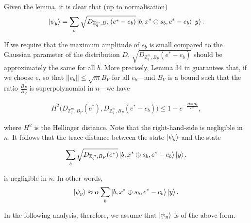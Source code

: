 \documentclass{article}
\begin{document}
\begin{itemize}
		Given the lemma, it is clear that (up to normalisation)
		\begin{align}
			\ket{\psi_y} = \sum_b \sqrt{D_{\mathbb{Z}_q^m, B_P}(e^* - e_b)} \ket{b, x^* \oplus s_b, e^* - e_b} \ket{y}.
		\end{align}

		If we require that the maximum amplitude of $e_b$ is small compared to the Gaussian parameter of the distribution $D$, $\sqrt{D_{\mathbb{Z}_q^m, B_P}(e^* - e_b)}$ should be approximately the same for all $b$. More precisely, Lemma 34 in \cite{randomness} guarantees that, if we choose $e_i$ so that $||e_b|| \leq \sqrt{m} B_V$ for all $e_b$---and $B_V$ is a bound such that the ratio $\frac{B_P}{B_V}$ is superpolynomial in $n$---we have

\begin{align}
	H^2\big( D_{\mathbb{Z}_q^m, B_P}(e^*), D_{\mathbb{Z}_q^m, B_P}(e^* - e_b) \big) \leq 1 - e^{-\frac{2\pi m B_V}{B_P}},
\end{align}

where $H^2$ is the Hellinger distance. Note that the right-hand-side is negligible in $n$. It follows that the trace distance between the state $\ket{\psi_y}$ and the state

		\begin{align}
			\sum_b \sqrt{D_{\mathbb{Z}_q^m, B_P}(e^*)} \ket{b, x^* \oplus s_b, e^* - e_b} \ket{y}.
		\end{align}

is negligible in $n$. In other words,
		\begin{align}
			\ket{\psi_y} \approx \alpha \sum_b \ket{b, x^* \oplus s_b, e^* - e_b} \ket{y}.
		\end{align}
\end{itemize}

In the following analysis, therefore, we assume that $\ket{\psi_y}$ is of the above form.
\end{document}
